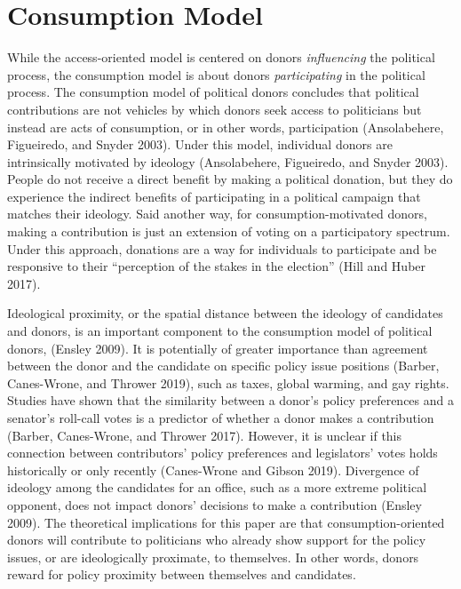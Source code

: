 \documentclass[12pt,]{article}
\begin{document}
\hypertarget{consumption-model}{%
\section{Consumption Model}\label{consumption-model}}

While the access-oriented model is centered on donors \emph{influencing}
the political process, the consumption model is about donors
\emph{participating} in the political process. The consumption model of
political donors concludes that political contributions are not vehicles
by which donors seek access to politicians but instead are acts of
consumption, or in other words, participation (Ansolabehere, Figueiredo,
and Snyder 2003). Under this model, individual donors are intrinsically
motivated by ideology (Ansolabehere, Figueiredo, and Snyder 2003).
People do not receive a direct benefit by making a political donation,
but they do experience the indirect benefits of participating in a
political campaign that matches their ideology. Said another way, for
consumption-motivated donors, making a contribution is just an extension
of voting on a participatory spectrum. Under this approach, donations
are a way for individuals to participate and be responsive to their
``perception of the stakes in the election'' (Hill and Huber 2017).

Ideological proximity, or the spatial distance between the ideology of
candidates and donors, is an important component to the consumption
model of political donors, (Ensley 2009). It is potentially of greater
importance than agreement between the donor and the candidate on
specific policy issue positions (Barber, Canes-Wrone, and Thrower 2019),
such as taxes, global warming, and gay rights. Studies have shown that
the similarity between a donor's policy preferences and a senator's
roll-call votes is a predictor of whether a donor makes a contribution
(Barber, Canes-Wrone, and Thrower 2017). However, it is unclear if this
connection between contributors' policy preferences and legislators'
votes holds historically or only recently (Canes-Wrone and Gibson 2019).
Divergence of ideology among the candidates for an office, such as a
more extreme political opponent, does not impact donors' decisions to
make a contribution (Ensley 2009). The theoretical implications for this
paper are that consumption-oriented donors will contribute to
politicians who already show support for the policy issues, or are
ideologically proximate, to themselves. In other words, donors reward
for policy proximity between themselves and candidates.
\end{document}
